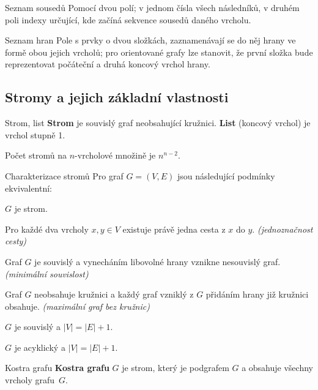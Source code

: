 \begin{definiceN}{Seznam sousedů}
Pomocí dvou polí; v jednom čísla všech následníků, v druhém poli indexy určující, kde začíná sekvence sousedů daného vrcholu.
\end{definiceN}

\begin{definiceN}{Seznam hran}
Pole s prvky o dvou složkách, zaznamenávají se do něj hrany ve formě obou jejich vrcholů; pro orientované grafy lze stanovit, že první složka bude reprezentovat počáteční a druhá koncový vrchol hrany.
\end{definiceN}

\pagebreak[3]
\subsection{Stromy a jejich základní vlastnosti}

\begin{definiceN}{Strom, list}
\textbf{Strom} je souvislý graf neobsahující kružnici. \textbf{List} (koncový vrchol) je vrchol stupně 1.
\end{definiceN}

\begin{veta}
Počet stromů na $n$-vrcholové množině je $n^{n-2}.$
\end{veta}

\begin{vetaN}{Charakterizace stromů}
Pro graf $G=(V,E)$ jsou následující podmínky ekvivalentní:
\begin{penumerate}
\item $G$ je strom.
\item Pro každé dva vrcholy $x,y \in V$ existuje právě jedna cesta z $x$ do $y.$ \textit{(jednoznačnost cesty)}
\item Graf $G$ je souvislý a vynecháním libovolné hrany vznikne nesouvislý graf. \textit{(minimální souvislost)}
\item Graf $G$ neobsahuje kružnici a každý graf vzniklý z $G$ přidáním hrany již kružnici obsahuje. \textit{(maximální graf bez kružnic)}
\item $G$ je souvislý a $|V|=|E|+1.$
\item $G$ je acyklický a $|V|=|E|+1.$
\end{penumerate}
\end{vetaN}

\begin{definiceN}{Kostra grafu}
\textbf{Kostra grafu} $G$ je strom, který je podgrafem $G$ a obsahuje všechny vrcholy grafu~$G$.
\end{definiceN}


